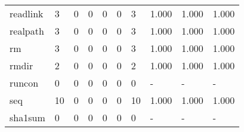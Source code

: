 \begin{longtable}{lp{2.0cm}p{2.0cm}p{2.0cm}p{2.0cm}p{2.0cm}p{2.0cm}p{2.0cm}p{2.0cm}p{2.0cm}}
readlink  &                      3 &                                             0 &                                            0 &                                           0 &                                            0 &                                          3 &                                1.000 &                                  1.000 &                                1.000 \\
realpath  &                      3 &                                             0 &                                            0 &                                           0 &                                            0 &                                          3 &                                1.000 &                                  1.000 &                                1.000 \\
rm        &                      3 &                                             0 &                                            0 &                                           0 &                                            0 &                                          3 &                                1.000 &                                  1.000 &                                1.000 \\
rmdir     &                      2 &                                             0 &                                            0 &                                           0 &                                            0 &                                          2 &                                1.000 &                                  1.000 &                                1.000 \\
runcon    &                      0 &                                             0 &                                            0 &                                           0 &                                            0 &                                          0 &                                    - &                                      - &                                    - \\
seq       &                     10 &                                             0 &                                            0 &                                           0 &                                            0 &                                         10 &                                1.000 &                                  1.000 &                                1.000 \\
sha1sum   &                      0 &                                             0 &                                            0 &                                           0 &                                            0 &                                          0 &                                    - &                                      - &                                    - \\

\end{longtable}
